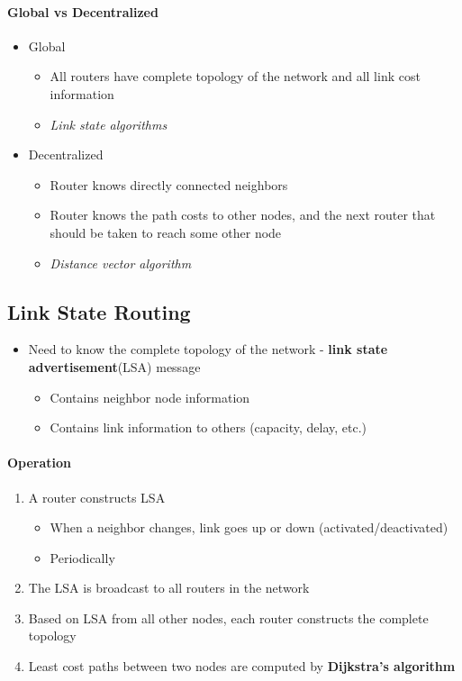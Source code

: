 \paragraph{Global vs Decentralized}
\begin{itemize}
	\item Global
	\begin{itemize}
		\item All routers have complete topology of the network and all link cost information
		\item \textit{Link state algorithms} 
	\end{itemize}
	\item Decentralized
	\begin{itemize}
		\item Router knows directly connected neighbors
		\item Router knows the path costs to other nodes, and the next router that should be taken to reach some other node
		\item \textit{Distance vector algorithm}
	\end{itemize}
\end{itemize}

\subsection{Link State Routing}
\begin{itemize}
	\item Need to know the complete topology of the network - \textbf{link state advertisement}(LSA) message
	\begin{itemize}
		\item Contains neighbor node information
		\item Contains link information to others (capacity, delay, etc.)
	\end{itemize}
\end{itemize}

\paragraph{Operation}
\begin{enumerate}
	\item A router constructs LSA
	\begin{itemize}
		\item When a neighbor changes, link goes up or down (activated/deactivated)
		\item Periodically
	\end{itemize}
	\item The LSA is broadcast to all routers in the network
	\item Based on LSA from all other nodes, each router constructs the complete topology
	\item Least cost paths between two nodes are computed by \textbf{Dijkstra's algorithm}
\end{enumerate}

